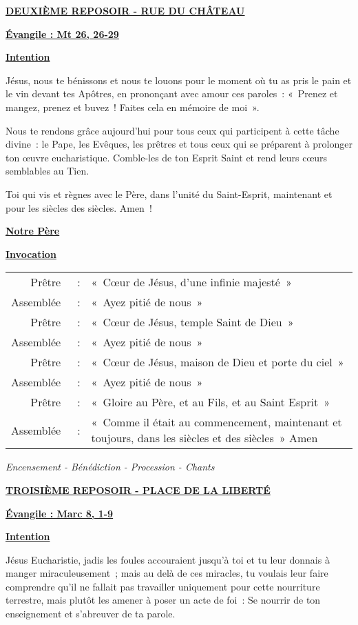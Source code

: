 \documentclass[french,11pt,a4paper]{article}
\newcommand{\NewsItem}[1]{%
\vspace{3pt}
\underline{\textbf{#1}}
		  }
\begin{document}
\NewsItem{DEUXIÈME REPOSOIR - RUE DU CHÂTEAU}

\NewsItem{Évangile : Mt 26, 26-29}

\NewsItem{Intention}
Jésus, nous te bénissons et nous te louons pour le moment où tu as pris le pain et le vin devant tes Apôtres, en prononçant avec amour ces paroles : « Prenez et mangez, prenez et buvez ! Faites cela en mémoire de moi ».

Nous te rendons grâce aujourd’hui pour tous ceux qui participent à cette tâche divine : le Pape, les Evêques, les prêtres et tous ceux qui se préparent à prolonger ton œuvre eucharistique. Comble-les de ton Esprit Saint et rend leurs cœurs semblables au Tien.

Toi qui vis et règnes avec le Père, dans l’unité du Saint-Esprit, maintenant et pour les siècles des siècles. Amen !

\NewsItem{Notre Père}

\NewsItem{Invocation}

\begin{tabular}{rcp{10cm}}
Prêtre & : &		« Cœur de Jésus, d’une infinie majesté » \\
Assemblée & : &	« Ayez pitié de nous » \\
Prêtre & : &		« Cœur de Jésus, temple Saint de Dieu » \\
Assemblée & : &	« Ayez pitié de nous » \\
Prêtre & : &		« Cœur de Jésus, maison de Dieu et porte du ciel » \\
Assemblée & : &	« Ayez pitié de nous » \\
Prêtre & : &		« Gloire au Père, et au Fils, et au Saint Esprit » \\
Assemblée & : &	« Comme il était au commencement, maintenant et toujours, dans les siècles et des siècles » Amen  \\
\end{tabular}
\emph{Encensement - Bénédiction - Procession - Chants}

\NewsItem{TROISIÈME REPOSOIR - PLACE DE LA LIBERTÉ}

\NewsItem{Évangile : Marc 8, 1-9}

\NewsItem{Intention}
Jésus Eucharistie, jadis les foules accouraient jusqu’à toi et tu leur donnais à manger miraculeusement ; mais au delà de ces miracles, tu voulais leur faire comprendre qu’il ne fallait pas travailler uniquement pour cette nourriture terrestre, mais plutôt les amener à poser un acte de foi : Se nourrir de ton enseignement et s’abreuver de ta parole.
\end{document}
